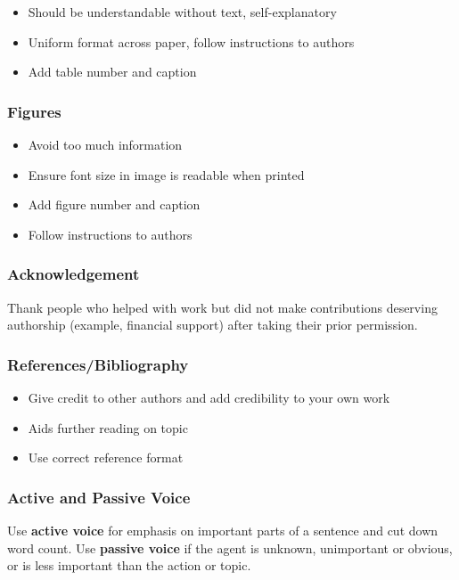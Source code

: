 \documentclass{article}
\begin{document}
\begin{itemize}
    \item Should be understandable without text, self-explanatory
    \item Uniform format across paper, follow instructions to authors
    \item Add table number and caption
\end{itemize}

\subsubsection{Figures}

\begin{itemize}
    \item Avoid too much information
    \item Ensure font size in image is readable when printed
    \item Add figure number and caption
    \item Follow instructions to authors
\end{itemize}

\subsubsection{Acknowledgement}

Thank people who helped with work but did not make contributions deserving authorship (example, financial support) after taking their prior permission.

\subsubsection{References/Bibliography}

\begin{itemize}
    \item Give credit to other authors and add credibility to your own work
    \item Aids further reading on topic
    \item Use correct reference format
\end{itemize}

\subsubsection{Active and Passive Voice}

Use \textbf{active voice} for emphasis on important parts of a sentence and cut down word count. Use \textbf{passive voice} if the agent is unknown, unimportant or obvious, or is less important than the action or topic.
\end{document}

